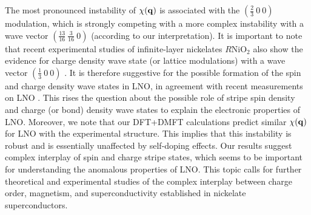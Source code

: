 \documentclass[prl,twocolumn,preprintnumbers,superscriptaddress]{revtex4-1}
\begin{document}
The most pronounced instability of $\chi({\bf q})$ is associated with the $(\frac{2}{3}~0~0)$ modulation, which is strongly competing with a more complex instability with a wave vector $(\frac{13}{16}~\frac{3}{16}~0)$ 
(according to our interpretation). It is important to note that recent experimental studies of infinite-layer nickelates $R$NiO$_2$ also show the evidence for charge density wave state (or lattice modulations) 
with a wave vector $(\frac{1}{3}~0~0)$ \cite{Rossi_2021,Tam_2021,Krieger_2021,Ren_2023,Raji_2023}. It is therefore suggestive for the possible formation of the spin and charge density wave states in LNO, in agreement with recent measurements 
on LNO \cite{Rossi_2021,Tam_2021,Krieger_2021,Ren_2023,Raji_2023,Liu_2023}. This rises the question about the possible role of stripe spin density and charge (or bond) density wave states \cite{Tranquada_1995,Keimer_2015} to explain the electronic properties of LNO. Moreover, we note that our DFT+DMFT calculations predict similar   $\chi({\bf q})$ for LNO with the experimental structure. This implies that this instability is robust and is essentially unaffected by self-doping effects.
%
Our results suggest complex interplay of spin and charge stripe states, which seems to be important for understanding the anomalous properties of LNO. This topic calls for further theoretical and experimental studies
of the complex interplay between charge order, magnetism, and superconductivity established in nickelate superconductors.


\end{document}
